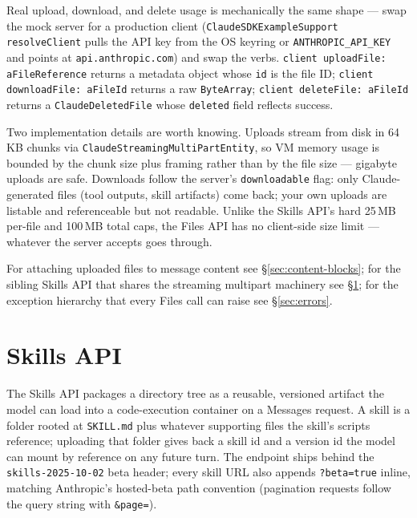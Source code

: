 \documentclass[a4paper,10pt,fleqn]{article}
\begin{document}
Real upload, download, and delete usage is mechanically the same
shape --- swap the mock server for a production client
(\texttt{ClaudeSDKExampleSupport resolveClient} pulls the API key from
the OS keyring or \texttt{ANTHROPIC\_API\_KEY} and points at
\texttt{api.anthropic.com}) and swap the verbs.
\texttt{client uploadFile: aFileReference} returns a metadata
object whose \texttt{id} is the file ID;
\texttt{client downloadFile: aFileId} returns a raw
\texttt{ByteArray}; \texttt{client deleteFile: aFileId} returns a
\texttt{ClaudeDeletedFile} whose \texttt{deleted} field reflects
success.

Two implementation details are worth knowing.  Uploads stream from
disk in 64\,KB chunks via
\texttt{ClaudeStreamingMultiPartEntity}, so VM memory usage is
bounded by the chunk size plus framing rather than by the file
size --- gigabyte uploads are safe.  Downloads follow the server's
\texttt{downloadable} flag: only Claude-generated files (tool
outputs, skill artifacts) come back; your own uploads are listable
and referenceable but not readable.  Unlike the Skills API's hard
25\,MB per-file and 100\,MB total caps, the Files API has no
client-side size limit --- whatever the server accepts goes
through.

For attaching uploaded files to message content see
\S\ref{sec:content-blocks}; for the sibling Skills API that shares
the streaming multipart machinery see \S\ref{sec:skills}; for the
exception hierarchy that every Files call can raise see
\S\ref{sec:errors}.

\medskip
{}

\section{Skills API}
\label{sec:skills}

The Skills API packages a directory tree as a reusable, versioned
artifact the model can load into a code-execution container on a
Messages request.  A skill is a folder rooted at \texttt{SKILL.md}
plus whatever supporting files the skill's scripts reference;
uploading that folder gives back a skill id and a version id the
model can mount by reference on any future turn.  The endpoint ships
behind the \texttt{skills-2025-10-02} beta header; every skill URL
also appends \texttt{?beta=true} inline, matching Anthropic's
hosted-beta path convention (pagination requests follow the query
string with \texttt{\&page=}).
\end{document}
